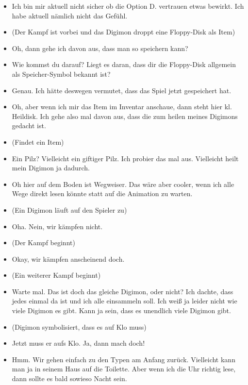 {\begin{itemize}[]
    \item {} Ich bin mir aktuell nicht sicher ob die Option \frq  D. vertrauen\flq{}  etwas bewirkt. Ich habe aktuell nämlich nicht das Gefühl.
    \item {} (Der Kampf ist vorbei und das Digimon droppt eine Floppy-Disk als Item)
    \item {} Oh, dann gehe ich davon aus, dass man so speichern kann?
    \item {} Wie kommst du darauf? Liegt es daran, dass dir die Floppy-Disk allgemein als Speicher-Symbol bekannt ist?
    \item {} Genau. Ich hätte deswegen vermutet, dass das Spiel jetzt gespeichert hat.
    \item {} Oh, aber wenn ich mir das Item im Inventar anschaue, dann steht hier \frq  kl. Heildisk\flq{}. Ich gehe also mal davon aus, dass die zum heilen meines Digimons gedacht ist.
    \item {} (Findet ein Item)
    \item {} Ein Pilz? Vielleicht ein giftiger Pilz. Ich probier das mal aus. Vielleicht heilt mein Digimon ja dadurch.
    \item {} Oh hier auf dem Boden ist Wegweiser. Das wäre aber cooler, wenn ich alle Wege direkt lesen könnte statt auf die Animation zu warten. 
    \item {} (Ein Digimon läuft auf den Spieler zu)
    \item {} Oha. Nein, wir kämpfen nicht. 
    \item {} (Der Kampf beginnt)
    \item {} Okay, wir kämpfen anscheinend doch. 
    \item {} (Ein weiterer Kampf beginnt)
    \item {} Warte mal. Das ist doch das gleiche Digimon, oder nicht? Ich dachte, dass jedes einmal da ist und ich alle einsammeln soll. Ich weiß ja leider nicht wie viele Digimon es gibt. Kann ja sein, dass es unendlich viele Digimon gibt.
    \item {} (Digimon symbolisiert, dass es auf Klo muss)
    \item {} Jetzt muss er aufs Klo. Ja, dann mach doch!
    \item {} Hmm. Wir gehen einfach zu den Typen am Anfang zurück. Vielleicht kann man ja in seinem Haus auf die Toilette. Aber wenn ich die Uhr richtig lese, dann sollte es bald sowieso Nacht sein.

\end{itemize}}
